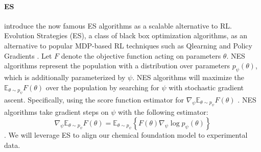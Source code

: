 \documentclass[10pt]{article}
\begin{document}
\paragraph{ES} \citet{salimans2017evolutionstrategiesscalablealternative} introduce the now famous ES algorithms as a scalable alternative to RL.   Evolution Strategies (ES), a class of black box optimization
algorithms, as an alternative to popular MDP-based RL techniques such as Qlearning and Policy Gradients \citep{salimans2017evolutionstrategiesscalablealternative}. Let $F$ denote the objective function acting on parameters $\theta$. NES algorithms
represent the population with a distribution over parameters $p_{\psi}(\theta)$, which is additionally parameterized by $\psi$. NES algorithms will maximize the $\mathbb{E}_{\theta \sim p_{\psi}} F(\theta)$ over the population by searching for $\psi$ with stochastic gradient ascent. Specifically, using the score function estimator for $\nabla_{\psi}\mathbb{E}_{\theta \sim p_{\psi}} F(\theta)$ \citep{salimans2017evolutionstrategiesscalablealternative}. NES algorithms take gradient steps on $\psi$ with the following estimator:
\begin{equation}
\nabla_{\psi}\mathbb{E}_{\theta \sim p_{\psi}} F(\theta)
= \mathbb{E}_{\theta \sim p_{\psi}} \left\{ F(\theta)\nabla_{\psi}\log p_{\psi}(\theta) \right\}
\end{equation} \citep{salimans2017evolutionstrategiesscalablealternative}.
We will leverage ES to align our chemical foundation model to experimental data.
\end{document}

